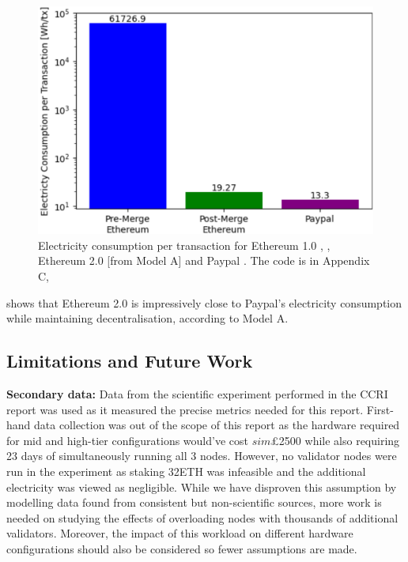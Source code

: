 \begin{figure}[!htb]
    \includegraphics[width=13cm,center]{Figures/PaypalEthElectrcityPlot.png}
    \caption{Electricity consumption per transaction for Ethereum 1.0 \cite{CCRIIndices}, \cite{EthereumBlockchair}, Ethereum 2.0 [from Model A] and Paypal \cite{2007IntroductionPayPal}. The code is in Appendix C, }
    \label{Figure:PaypalEthElectrcityPlot}
\end{figure}

 shows that Ethereum 2.0 is impressively close to Paypal's electricity consumption while maintaining decentralisation, according to Model A.



\subsection{Limitations and Future Work}
\label{LimitationsFutureWork}

\textbf{Secondary data:} Data from the scientific experiment performed in the CCRI report \cite{CryptoCarbonRatingsInstitute2022TheNetwork} was used as it measured the precise metrics needed for this report. First-hand data collection was out of the scope of this report as the hardware required for mid and high-tier configurations would've cost $sim$£2500 while also requiring 23 days of simultaneously running all 3 nodes. However, no validator nodes were run in the experiment as staking 32ETH was infeasible and the additional electricity was viewed as negligible. While we have disproven this assumption by modelling data found from consistent but non-scientific sources, more work is needed on studying the effects of overloading nodes with thousands of additional validators. Moreover, the impact of this workload on different hardware configurations should also be considered so fewer assumptions are made. 

